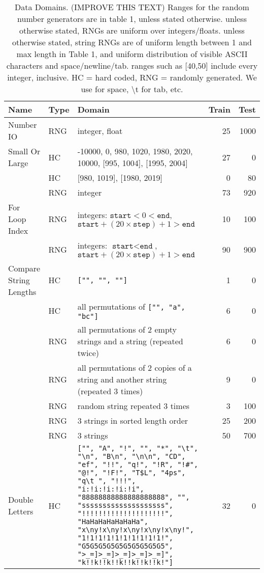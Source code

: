 \documentclass{sig-alternate}
\begin{document}
\begin{table*}
\centering
\caption{Data Domains. (IMPROVE THIS TEXT) Ranges for the random number generators are in table 1, unless stated otherwise. unless otherwise stated, RNGs are uniform over integers/floats. unless otherwise stated, string RNGs are of uniform length between 1 and max length in Table 1, and uniform distribution of visible ASCII characters and space/newline/tab. ranges such as [40,50] include every integer, inclusive. HC = hard coded, RNG = randomly generated. We use \textvisiblespace for space, \textbackslash t for tab, etc.}
\label{whatwhat}
\begin{tabular}{>{\raggedright}p{3.5cm} l >{\raggedright}p{9.8cm} rr}
\toprule
\textbf{Name} & \textbf{Type} & \textbf{Domain} & \textbf{Train} & \textbf{Test} \\
\midrule
Number IO & RNG & integer, float & 25 & 1000 \tabularnewline
Small Or Large & HC & -10000, 0, 980, 1020, 1980, 2020, 10000, [995, 1004], [1995, 2004] & 27 & 0 \tabularnewline
 & HC & [980, 1019], [1980, 2019] & 0 & 80 \tabularnewline
 & RNG & integer & 73 & 920 \tabularnewline
For Loop Index & RNG & integers: $\texttt{start} < 0 < \texttt{end}$, $ \texttt{start} + (20 \times \texttt{step}) + 1 > \texttt{end}$ & 10 & 100 \tabularnewline
 & RNG & integers: $\texttt{start} < \texttt{end}$, $ \texttt{start} + (20 \times \texttt{step}) + 1 > \texttt{end}$ & 90 & 900 \tabularnewline
Compare String Lengths & HC & \texttt{["", "", ""]} & 1 & 0 \tabularnewline
 & HC & all permutations of \texttt{["", "a", "bc"]} & 6 & 0 \tabularnewline
 & RNG & all permutations of 2 empty strings and a string (repeated twice) & 6 & 0 \tabularnewline
 & RNG & all permutations of 2 copies of a string and another string (repeated 3 times) & 9 & 0 \tabularnewline
 & RNG & random string repeated 3 times & 3 & 100 \tabularnewline
 & RNG & 3 strings in sorted length order & 25 & 200 \tabularnewline
 & RNG & 3 strings & 50 & 700 \tabularnewline
Double Letters & HC & \texttt{["", "A", "!", "\textvisiblespace", "*", "\textbackslash t", "\textbackslash n", "B\textbackslash n", "\textbackslash n\textbackslash n", "CD", "ef", "!!", "q!", "!R", "!\#", "@!", "!F!", "T\$L", "4ps", "q\textbackslash t ", "!!!", "i:!i:!i:!i:!i", "88888888888888888888", "\textvisiblespace\textvisiblespace\textvisiblespace\textvisiblespace \textvisiblespace\textvisiblespace\textvisiblespace\textvisiblespace \textvisiblespace\textvisiblespace\textvisiblespace\textvisiblespace \textvisiblespace\textvisiblespace\textvisiblespace\textvisiblespace \textvisiblespace\textvisiblespace\textvisiblespace\textvisiblespace", "ssssssssssssssssssss", "!!!!!!!!!!!!!!!!!!!!", "Ha\textvisiblespace Ha\textvisiblespace Ha\textvisiblespace Ha\textvisiblespace Ha\textvisiblespace Ha\textvisiblespace Ha", "x\textbackslash ny!x\textbackslash ny!x\textbackslash ny!x\textbackslash ny!x\textbackslash ny!", "1!1!1!1!1!1!1!1!1!1!", "G5G5G5G5G5G5G5G5G5G5", ">_=]>_=]>_=]>_=]>_=]", "k!!k!!k!!k!!k!!k!!k!"]} & 32 & 0 \tabularnewline

\end{tabular}
\end{table*}
\end{document}
